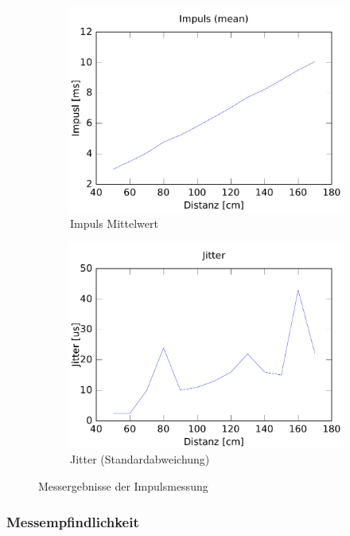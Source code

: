\begin{figure}[h!]
	\centering
	\begin{subfigure}[b]{0.45\textwidth}
		\includegraphics[width=\textwidth]{../../fig/hc-sr04_accuracy.pdf}
		\caption{Impuls Mittelwert}
	\end{subfigure}
	\begin{subfigure}[b]{0.45\textwidth}
		\includegraphics[width=\textwidth]{../../fig/hc-sr04_jitter.pdf}
		\caption{Jitter (Standardabweichung)}
	\end{subfigure}
	\caption{Messergebnisse der Impulsmessung}
\end{figure}

\subsubsection{Messempfindlichkeit}
